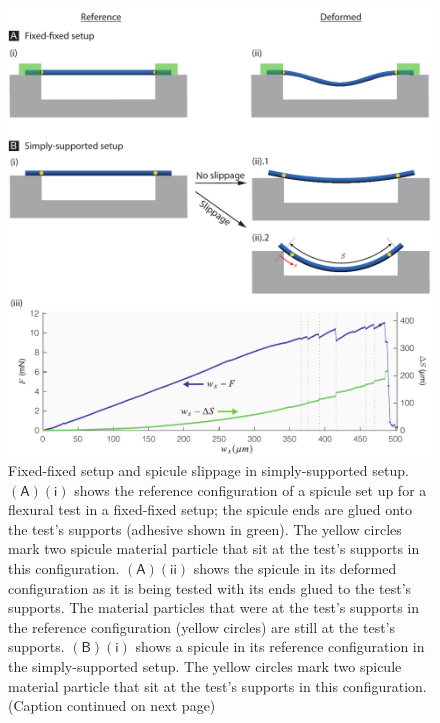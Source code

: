 \documentclass[preprint,10pt,times]{elsarticle}
\numberwithin{equation}{section}
\newcommand{\pr}[1]{\left( #1 \right)}
\newcommand{\subf}[1]{\pr{\textsf{#1}}}
\begin{document}
\begin{figure}
\centering{}
\includegraphics[width=1\textwidth]{../Figures_Submit/Slip_V8.pdf}
\caption{Fixed-fixed setup and spicule slippage in simply-supported
setup.
$\subf{A}$$\subf{i}$ shows the reference configuration of
a spicule set up for a flexural test in a fixed-fixed setup; the spicule
ends are glued onto the test's supports (adhesive shown in green). The yellow circles mark two spicule material particle that sit at
the test's supports in this configuration. %
$\subf{A}$$\subf{ii}$ shows the spicule in its deformed configuration as it is being tested with its ends glued to the test's supports. The material particles that were at the test's supports in the reference configuration (yellow circles) are still at the test's supports. %
$\subf{B}$$\subf{i}$ shows a spicule in its reference configuration in the simply-supported setup. %
The yellow circles mark two spicule material particle that sit at
the test's supports in this configuration. %
(Caption continued on next page)}
\label{fig:slip2}
\end{figure}
\end{document}
